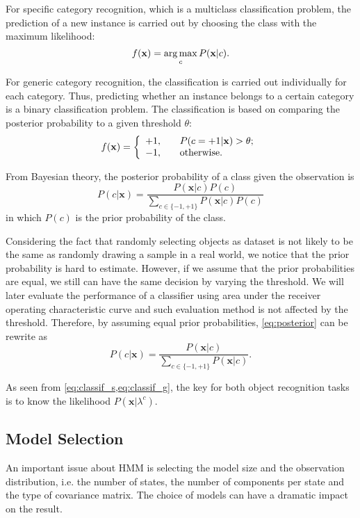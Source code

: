 \documentclass[12pt,final,twoside]{report}
\begin{document}
For specific category recognition, which is a multiclass classification problem, the prediction of a new instance is carried out by choosing the class with the maximum likelihood:
\begin{equation}
  \label{eq:classif_s}
  f(\mathbf{x}) = \operatorname*{arg\,max}_{c} P(\mathbf{x}|c) .
\end{equation}

For generic category recognition, the classification is carried out individually for each category. Thus, predicting whether an instance belongs to a certain category is a binary classification problem. The classification is based on comparing the posterior probability to a given threshold $\theta$:
\begin{equation}
  \label{eq:classif_g}
  f(\mathbf{x}) = 
  \left\{ \begin{array}{l l} +1, & \quad P(c=+1|\mathbf{x}) > \theta; \\ -1, & \quad \text{otherwise.}
  \end{array} \right.
\end{equation}

From Bayesian theory, the posterior probability of a class given the observation is
\begin{equation} \label{eq:posterior}
  P(c|\mathbf{x}) = \frac{P(\mathbf{x}|c)P(c)}{\sum_{c \in \{-1,+1\}} P(\mathbf{x}|c)P(c)}
\end{equation}
in which $P(c)$ is the prior probability of the class.

Considering the fact that randomly selecting objects as dataset is not likely to be the same as randomly drawing a sample in a real world, we notice that the prior probability is hard to estimate. However, if we assume that the prior probabilities are equal, we still can have the same decision by varying the threshold. We will later evaluate the performance of a classifier using area under the receiver operating characteristic curve and such evaluation method is not affected by the threshold. Therefore, by assuming equal prior probabilities, \cref{eq:posterior} can be rewrite as 
\begin{equation}
  \label{eq:postsimp}
  P(c|\mathbf{x}) = \frac{P(\mathbf{x}|c)}{\sum_{c \in \{-1,+1\}} P(\mathbf{x}|c)} .
\end{equation}

As seen from \cref{eq:classif_s,eq:classif_g}, the key for both object recognition tasks is to know the likelihood $P(\mathbf{x}|\lambda^c)$.

\subsection{Model Selection}
An important issue about HMM is selecting the model size and the observation distribution, i.e. the number of states, the number of components per state and the type of covariance matrix. The choice of models can have a dramatic impact on the result.
\end{document}
